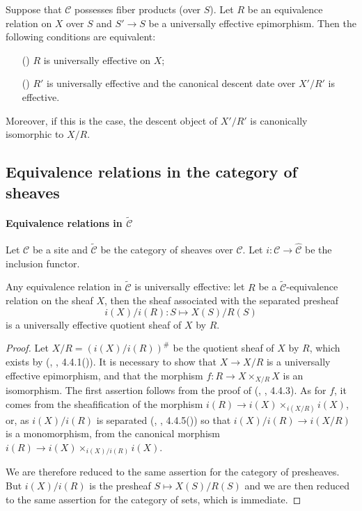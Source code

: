 \begin{corollary}\label{category equivalence relation universally effective and descent}
Suppose that $\mathcal{C}$ possesses fiber products (over $S$). Let $R$ be an equivalence relation on $X$ over $S$ and $S'\to S$ be a universally effective epimorphism. Then the following conditions are equivalent:
\begin{enumerate}
    \item[(\rmnum{1})] $R$ is universally effective on $X$;
    \item[(\rmnum{2})] $R'$ is universally effective and the canonical descent date over $X'/R'$ is effective.
\end{enumerate}
Moreover, if this is the case, the descent object of $X'/R'$ is canonically isomorphic to $X/R$.
\end{corollary}

\subsection{Equivalence relations in the category of sheaves}

\paragraph{Equivalence relations in \texorpdfstring{$\widetilde{\mathcal{C}}$}{C}}

Let $\mathcal{C}$ be a site and $\widetilde{\mathcal{C}}$ be the category of sheaves over $\mathcal{C}$. Let $i:\mathcal{C}\to\widehat{\mathcal{C}}$ be the inclusion functor.

\begin{proposition}\label{site sheaf equivalence relation is universally effective}
Any equivalence relation in $\widetilde{\mathcal{C}}$ is universally effective: let $R$ be a $\widetilde{\mathcal{C}}$-equivalence relation on the sheaf $X$, then the sheaf associated with the separated presheaf
\[i(X)/i(R):S\mapsto X(S)/R(S)\]
is a universally effective quotient sheaf of $X$ by $R$.
\end{proposition}
\begin{proof}
Let $X/R=(i(X)/i(R))^\#$ be the quotient sheaf of $X$ by $R$, which exists by (\cite{SGA3}, , 4.4.1()). It is necessary to show that $X\to X/R$ is a universally effective epimorphism, and that the morphism $f:R\to X\times_{X/R}X$ is an isomorphism. The first assertion follows from the proof of (\cite{SGA3}, , 4.4.3). As for $f$, it comes from the sheafification of the morphism $i(R)\to i(X)\times_{i(X/R)}i(X)$, or, as $i(X)/i(R)$ is separated (\cite{SGA3}, , 4.4.5()) so that $i(X)/i(R)\to i(X/R)$ is a monomorphism, from the canonical morphism $i(R)\to i(X)\times_{i(X)/i(R)}i(X)$.\par
We are therefore reduced to the same assertion for the category of presheaves. But $i(X)/i(R)$ is the presheaf $S\mapsto X(S)/R(S)$ and we are then reduced to the same assertion for the category of sets, which is immediate.
\end{proof}

